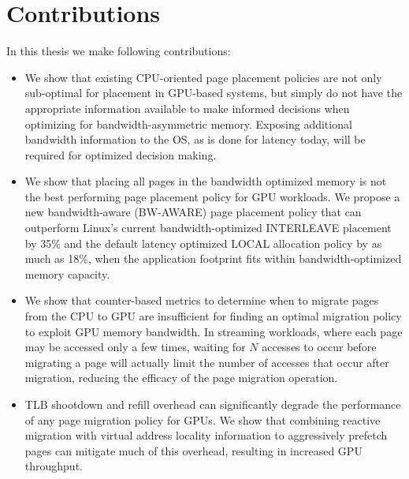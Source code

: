 \section{Contributions}
In this thesis we make following contributions:

\begin{itemize}
\item
We show that existing CPU-oriented page placement policies are not only 
sub-optimal for placement in GPU-based systems, but simply do not have the 
appropriate information available to make informed decisions when optimizing for 
bandwidth-asymmetric memory.  Exposing additional bandwidth information 
to the OS, as is done for latency today, will be required for optimized decision 
making.

\item
We show that placing all pages in the bandwidth optimized memory is not the best
performing page placement policy for GPU workloads.  We propose a new
bandwidth-aware (BW-AWARE) page placement policy that can outperform Linux's
current bandwidth-optimized INTERLEAVE placement by 35\% and the default latency
optimized LOCAL allocation policy by as much as 18\%, when the application
footprint fits within bandwidth-optimized memory capacity.  


\item
We show that counter-based metrics to determine when to migrate pages from the
CPU to GPU are insufficient for finding an optimal migration policy to exploit
GPU memory bandwidth.  In streaming workloads, where each page may be accessed
only a few times, waiting for $N$ accesses to occur before migrating a page will
actually limit the number of accesses that occur after migration, reducing the
efficacy of the page migration operation.

\item
TLB shootdown and refill overhead can significantly degrade the performance of
any page migration policy for GPUs\@. We show that combining reactive migration
with virtual address locality information to aggressively prefetch pages can
mitigate much of this overhead, resulting in increased GPU throughput.


\end{itemize}
